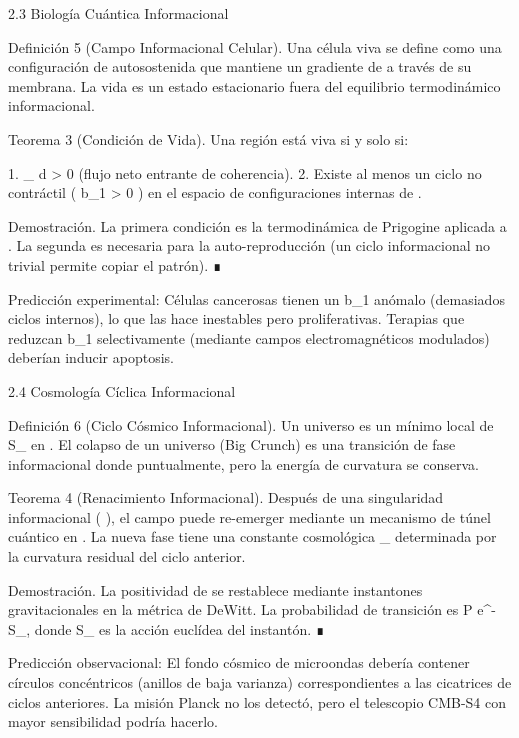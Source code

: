 \documentclass[12pt,twoside]{book}
\begin{document}
2.3 Biología Cuántica Informacional

Definición 5 (Campo Informacional Celular). Una célula viva se define como una configuración de  \rho  autosostenida que mantiene un gradiente de  \nabla \rho {}  a través de su membrana. La vida es un estado estacionario fuera del equilibrio termodinámico informacional.

Teorema 3 (Condición de Vida). Una región  \Omega  está viva si y solo si:

1.  \int_{\partial\Omega} \nabla \rho \cdot d > 0  (flujo neto entrante de coherencia).
2. Existe al menos un ciclo no contráctil ( b_1 > 0 ) en el espacio de configuraciones internas de  \rho .

Demostración. La primera condición es la termodinámica de Prigogine aplicada a  \rho . La segunda es necesaria para la auto-reproducción (un ciclo informacional no trivial permite copiar el patrón). ∎

Predicción experimental: Células cancerosas tienen un  b_1  anómalo (demasiados ciclos internos), lo que las hace inestables pero proliferativas. Terapias que reduzcan  b_1  selectivamente (mediante campos electromagnéticos modulados) deberían inducir apoptosis.

2.4 Cosmología Cíclica Informacional

Definición 6 (Ciclo Cósmico Informacional). Un universo es un mínimo local de  S_{}  en   . El colapso de un universo (Big Crunch) es una transición de fase informacional donde  \rho {}  puntualmente, pero la energía de curvatura se conserva.

Teorema 4 (Renacimiento Informacional). Después de una singularidad informacional ( \rho {} ), el campo  \rho  puede re-emerger mediante un mecanismo de túnel cuántico en   . La nueva fase tiene una constante cosmológica  \Lambda_{}  determinada por la curvatura residual del ciclo anterior.

Demostración. La positividad de  \rho  se restablece mediante instantones gravitacionales en la métrica de DeWitt. La probabilidad de transición es  P \propto e^{-S_{}},  donde  S_{}  es la acción euclídea del instantón. ∎

Predicción observacional: El fondo cósmico de microondas debería contener círculos concéntricos (anillos de baja varianza) correspondientes a las cicatrices de ciclos anteriores. La misión Planck no los detectó, pero el telescopio CMB-S4 con mayor sensibilidad podría hacerlo.
\end{document}
